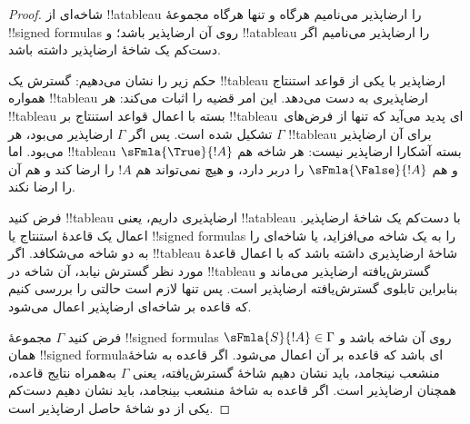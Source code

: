 \documentclass[../../../include/open-logic-section]{subfiles}
\begin{document}
\begin{proof}
شاخه‌ای از !!a{tableau} را ارضاپذیر می‌نامیم هرگاه و تنها هرگاه مجموعهٔ
!!{signed formula}s روی آن ارضاپذیر باشد؛ و !!a{tableau} را ارضاپذیر
می‌نامیم اگر دست‌کم یک شاخهٔ ارضاپذیر داشته باشد.

حکم زیر را نشان می‌دهیم: گسترش یک !!{tableau} ارضاپذیر با یکی از قواعد
استنتاج همواره !!{tableau} ارضاپذیری به دست می‌دهد. این امر قضیه را
اثبات می‌کند: هر !!{tableau} بسته با اعمال قواعد استنتاج بر !!{tableau}ای
پدید می‌آید که تنها از فرض‌های~$\Gamma$ تشکیل شده است. پس اگر $\Gamma$
ارضاپذیر می‌بود، هر !!{tableau} برای آن ارضاپذیر می‌بود. اما
!!{tableau} بسته آشکارا ارضاپذیر نیست: هر شاخه هم
$\sFmla{\True}{!A}$ و هم $\sFmla{\False}{!A}$ را دربر دارد، و هیچ
 نمی‌تواند هم $!A$ را ارضا
کند و هم آن را ارضا نکند.

فرض کنید !!{tableau} ارضاپذیری داریم، یعنی !!a{tableau} با دست‌کم یک
شاخهٔ ارضاپذیر. اعمال یک قاعدهٔ استنتاج یا !!{signed formula}s را به
یک شاخه می‌افزاید، یا شاخه‌ای را به دو شاخه می‌شکافد. اگر !!{tableau}
شاخهٔ ارضاپذیری داشته باشد که با اعمال قاعدهٔ مورد نظر گسترش نیابد، آن
شاخه در !!{tableau} گسترش‌یافته ارضاپذیر می‌ماند و بنابراین تابلوی
گسترش‌یافته ارضاپذیر است. پس تنها لازم است حالتی را بررسی کنیم که قاعده
بر شاخه‌ای ارضاپذیر اعمال می‌شود.

فرض کنید $\Gamma$ مجموعهٔ !!{signed formula}s روی آن شاخه باشد و
$\sFmla{S}{!A} \in \Gamma$ همان !!{signed formula}ای باشد که قاعده بر
آن اعمال می‌شود. اگر قاعده به شاخهٔ منشعب نینجامد، باید نشان دهیم شاخهٔ
گسترش‌یافته، یعنی $\Gamma$ به‌همراه نتایج قاعده، همچنان ارضاپذیر است.
اگر قاعده به شاخهٔ منشعب بینجامد، باید نشان دهیم دست‌کم یکی از دو شاخهٔ
حاصل ارضاپذیر است.


\end{proof}
\end{document}
